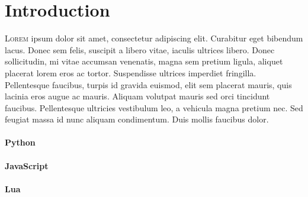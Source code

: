 \section{Introduction}

\lettrine[nindent=0em,lines=3]{L}{orem} ipsum dolor sit amet, consectetur adipiscing elit. Curabitur eget bibendum lacus. Donec sem felis, suscipit a libero vitae, iaculis ultrices libero. Donec sollicitudin, mi vitae accumsan venenatis, magna sem pretium ligula, aliquet placerat lorem eros ac tortor. Suspendisse ultrices imperdiet fringilla. Pellentesque faucibus, turpis id gravida euismod, elit sem placerat mauris, quis lacinia eros augue ac mauris. Aliquam volutpat mauris sed orci tincidunt faucibus. Pellentesque ultricies vestibulum leo, a vehicula magna pretium nec. Sed feugiat massa id nunc aliquam condimentum. Duis mollis faucibus dolor.

\paragraph{Python}


\paragraph{JavaScript}


\paragraph{Lua}
